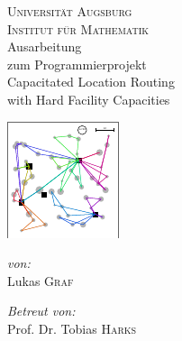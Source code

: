 \documentclass[a4paper,ngerman,11pt,bibtotoc]{scrartcl}
\theoremstyle{definition}
\theoremstyle{plain}
\theoremstyle{remark}
\begin{document}
\author{Lukas Graf}
\date{Letzte Aktualisierung: \today}

\thispagestyle{empty}


\begin{titlepage}\center
	\textsc{\LARGE Universität Augsburg}\\[1cm]
	
	\textsc{\Large Institut für Mathematik}\\[1.5cm]
	
	{\Large Ausarbeitung \\[1cm]}
	zum Programmierprojekt\\[1cm]
	{\huge Capacitated Location Routing \\ with Hard Facility Capacities}

	\begin{center}
		\includegraphics[width=.6\textwidth]{bilder/title.pdf}
	\end{center}		
	
	\vfill
	
	\begin{minipage}{0.4\textwidth}
		\begin{flushleft} \large
			\emph{von:}\\
			Lukas \textsc{Graf}
		\end{flushleft}
	\end{minipage}
	\begin{minipage}{0.4\textwidth}
		\begin{flushright} \large
			\emph{Betreut von:} \\
			Prof. Dr. Tobias \textsc{Harks}
		\end{flushright}
	\end{minipage}
	
\end{titlepage}
\end{document}
